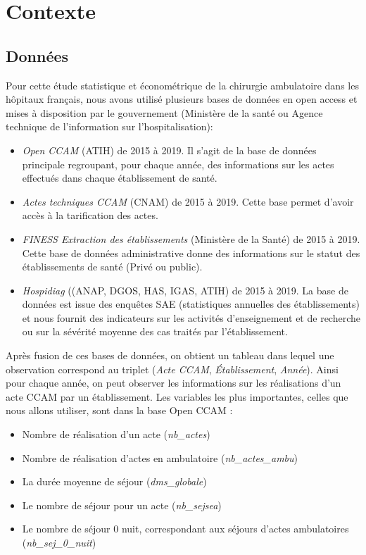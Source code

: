 \section{Contexte}

\subsection{Données}


Pour cette étude statistique et économétrique de la chirurgie ambulatoire dans les hôpitaux français, nous avons utilisé plusieurs bases de données en open access et mises à disposition par le gouvernement (Ministère de la santé ou Agence technique de l'information sur l'hospitalisation):

\begin{itemize}
    \item \textit{Open CCAM} (ATIH) de 2015 à 2019. Il s'agit de la base de données principale regroupant, pour chaque année, des informations sur les actes effectués dans chaque établissement de santé.
    \item \textit{Actes techniques CCAM} (CNAM) de 2015 à 2019. Cette base permet d'avoir accès à la tarification des actes.
    \item \textit{FINESS Extraction des établissements} (Ministère de la Santé) de 2015 à 2019. Cette base de données administrative donne des informations sur le statut des établissements de santé (Privé ou public).
    \item \textit{Hospidiag} ((ANAP, DGOS, HAS, IGAS, ATIH) de 2015 à 2019. La base de données est issue des enquêtes SAE (statistiques annuelles des établissements) et nous fournit des indicateurs sur les activités d'enseignement et de recherche ou sur la sévérité moyenne des cas traités par l'établissement.
\end{itemize}

\bigskip

Après fusion de ces bases de données, on obtient un tableau dans lequel une observation correspond au triplet (\textit{Acte CCAM}, \textit{Établissement}, \textit{Année}). Ainsi pour chaque année, on peut observer les informations sur les réalisations d'un acte CCAM par un établissement. Les variables les plus importantes, celles que nous allons utiliser, sont dans la base Open CCAM :

\begin{itemize}
    \item  Nombre de réalisation d'un acte (\textit{nb\_actes})
    \item Nombre de réalisation d'actes en ambulatoire (\textit{nb\_actes\_ambu})
    \item La durée moyenne de séjour (\textit{dms\_globale})
    \item Le nombre de séjour pour un acte (\textit{nb\_sejsea})
    \item Le nombre de séjour 0 nuit, correspondant aux séjours d'actes ambulatoires (\textit{nb\_sej\_0\_nuit}) 
\end{itemize}

